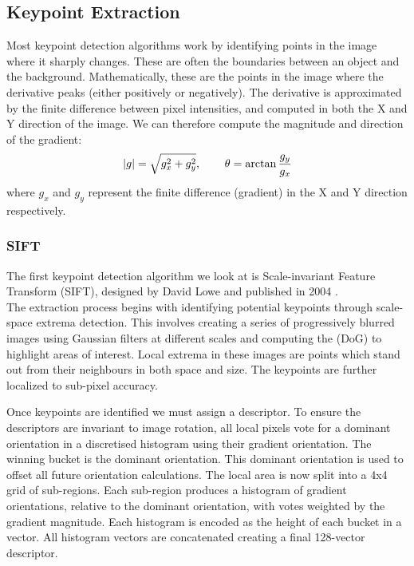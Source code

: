 \subsection{Keypoint Extraction}
Most keypoint detection algorithms work by identifying points in the image where it sharply changes. These are often the boundaries between an object and the background. Mathematically, these are the points in the image where the derivative peaks (either positively or negatively). The derivative is approximated by the finite difference between pixel intensities, and computed in both the X and Y direction of the image. We can therefore compute the magnitude and direction of the gradient:
$$|g| = \sqrt{g^2_x + g^2_y}, \operatorname{\operatorname{\: \: \: \:} \operatorname{\: \: \: \:}} \theta = \arctan{\frac{g_y}{g_x}}$$
where $g_x$ and $g_y$ represent the finite difference (gradient) in the X and Y direction respectively. 

\subsubsection{SIFT}
The first keypoint detection algorithm we look at is Scale-invariant Feature Transform (SIFT), designed by David Lowe and published in 2004 \cite{SIFT}.\\

The extraction process begins with identifying potential keypoints through scale-space extrema detection. This involves creating a series of progressively blurred images using Gaussian filters at different scales and computing the  (DoG) to highlight areas of interest. Local extrema in these images are points which stand out from their neighbours in both space and size. The keypoints are further localized to sub-pixel accuracy.

Once keypoints are identified we must assign a descriptor. To ensure the descriptors are invariant to image rotation, all local pixels vote for a dominant orientation in a discretised histogram using their gradient orientation. The winning bucket is the dominant orientation. This dominant orientation is used to offset all future orientation calculations. The local area is now split into a 4x4 grid of sub-regions. Each sub-region produces a histogram of gradient orientations, relative to the dominant orientation, with votes weighted by the gradient magnitude. Each histogram is encoded as the height of each bucket in a vector. All histogram vectors are concatenated creating a final 128-vector descriptor.


